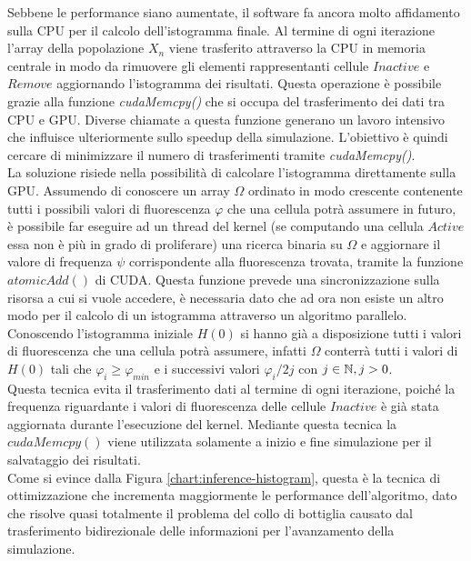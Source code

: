 Sebbene le performance siano aumentate, il software fa ancora molto affidamento
sulla CPU per il calcolo dell'istogramma finale.
Al termine di ogni iterazione l'array della popolazione $X_{n}$ viene trasferito
attraverso la CPU in memoria centrale in modo da rimuovere gli elementi 
rappresentanti cellule $Inactive$ e $Remove$ aggiornando l'istogramma 
dei risultati. Questa operazione è possibile grazie alla funzione
\textit{cudaMemcpy()} che si occupa del trasferimento dei dati tra CPU e GPU.
Diverse chiamate a questa funzione generano un lavoro intensivo che 
influisce ulteriormente sullo speedup della simulazione.
L'obiettivo è quindi cercare di minimizzare il numero di trasferimenti tramite
\textit{cudaMemcpy()}.
\\
La soluzione risiede nella possibilità di calcolare l'istogramma direttamente
sulla GPU. Assumendo di conoscere un array $\Omega$ ordinato in modo crescente
contenente tutti i possibili valori di fluorescenza
$\varphi$ che una cellula potrà assumere in futuro, è possibile far eseguire
ad un thread del kernel (se computando una cellula $Active$ essa non è più in
grado di proliferare) una ricerca binaria su $\Omega$ e aggiornare
il valore di frequenza $\psi$ corrispondente alla fluorescenza trovata, tramite
la funzione $atomicAdd()$ di CUDA. Questa funzione prevede una
sincronizzazione sulla risorsa a cui si vuole accedere, è necessaria dato che
ad ora non esiste un altro modo per il calcolo di un istogramma attraverso un
algoritmo parallelo.
\\
Conoscendo l'istogramma iniziale $H(0)$ si hanno già a disposizione
tutti i valori di fluorescenza che una cellula potrà assumere, infatti
$\Omega$ conterrà tutti i valori di $H(0)$ tali che $\varphi_{i} \geqslant
\varphi_{min}$ e i successivi valori $\varphi_{i}/{2j}$ con $j \in \mathbb{N}, j > 0$.
\\
Questa tecnica evita il trasferimento dati al termine di ogni iterazione, poiché
la frequenza riguardante i valori di fluorescenza delle cellule $Inactive$
è già stata aggiornata durante l'esecuzione del kernel.
Mediante questa tecnica la $cudaMemcpy()$ viene utilizzata solamente a inizio
e fine simulazione per il salvataggio dei risultati.
\\
Come si evince dalla Figura \ref{chart:inference-histogram}, 
questa è la tecnica di ottimizzazione che incrementa maggiormente
le performance dell'algoritmo, dato che risolve quasi totalmente il problema
del collo di bottiglia causato dal trasferimento bidirezionale delle informazioni
per l'avanzamento della simulazione.


